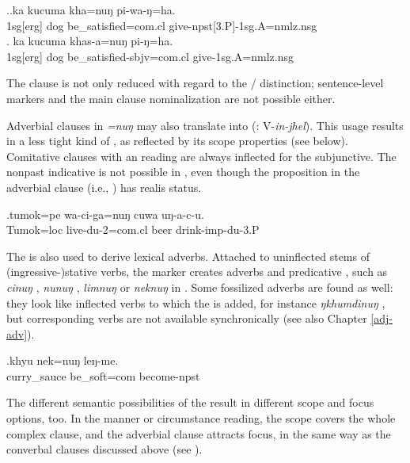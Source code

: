 \ex.\ag.ka kucuma kha=nuŋ pi-wa-ŋ=ha.\\
{\sc 1sg[erg]} dog   be\_satisfied{\sc [sbjv;3sg]=com.cl} give{\sc -npst[3.P]-1sg.A=nmlz.nsg}\\
\bg. ka kucuma khas-a=nuŋ pi-ŋ=ha.\\
{\sc 1sg[erg]} dog   be\_satisfied{\sc [3sg]-sbjv=com.cl} give{\sc [pst;3.P]-1sg.A=nmlz.nsg}\\

The clause is not only reduced with regard to the / distinction; sen\-tence-level markers and the main clause nominalization are not possible either. 

Adverbial clauses in \emph{=nuŋ} may also  translate into  (: V-\emph{in-jhel}). This usage results in a less tight kind of , as reflected by its scope properties (see below). Comitative clauses with an  reading are always inflected for the subjunctive. The nonpast indicative is not possible in \Next, even though the proposition in the adverbial clause (i.e., ) has realis status.%

\exg.\label{ex-nung}tumok=pe wa-ci-ga=nuŋ cuwa uŋ-a-c-u.\\
Tumok{\sc =loc} live{\sc [sbjv]-du-2=com.cl} beer    drink{\sc -imp-du-3.P}\\


The  is also used to derive lexical adverbs. Attached to uninflected stems of (ingressive-)stative verbs, the marker creates adverbs and predicative , such as \emph{cinuŋ} , \emph{nunuŋ} , \emph{limnuŋ}  or \emph{neknuŋ}  in \Next.  Some fossilized adverbs are found as well: they look like inflected verbs to which the  is added, for instance \emph{ŋkhumdinuŋ} , but corresponding verbs are not available synchronically (see also Chapter \ref{adj-adv}).
 
\exg.khyu  nek=nuŋ leŋ-me.\\
curry\_sauce    be\_soft{\sc =com} become{\sc [3sg]-npst}\\
 


The different semantic possibilities of the  result in different scope and focus options, too. In the manner or circumstance reading, the  scope covers the whole complex clause, and the adverbial clause attracts focus, in the same way as the  converbal clauses discussed above (see \Next[a]). 

